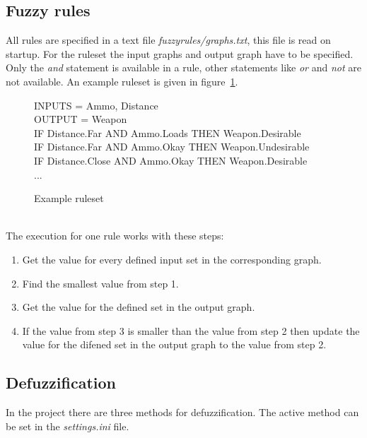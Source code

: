 \documentclass[10pt]{extarticle} %
\begin{document}
   \subsection{Fuzzy rules}
   All rules are specified in a text file \emph{fuzzyrules/graphs.txt}, this file is read on startup. For the ruleset the input graphs and output graph have to be specified. Only the \emph{and} statement is available in a rule, other statements like \emph{or} and \emph{not} are not available. An example ruleset is given in figure~\ref{fig:ruleset}.
   \begin{figure}[h!]
   {\ttfamily 
   		INPUTS = Ammo, Distance\\
  	 	OUTPUT = Weapon\\
   		IF Distance.Far AND Ammo.Loads THEN Weapon.Desirable \\
   		IF Distance.Far AND Ammo.Okay THEN Weapon.Undesirable \\
   		IF Distance.Close AND Ammo.Okay THEN Weapon.Desirable \\
   		...
   }
   \caption{Example ruleset}
   \label{fig:ruleset}
   \end{figure}\\
   The execution for one rule works with these steps:
   \begin{enumerate}
   \item Get the value for every defined input set in the corresponding graph.
   \item Find the smallest value from step 1.
   \item Get the value for the defined set in the output graph.
   \item If the value from step 3 is smaller than the value from step 2 then update the value for the difened set in the output graph to the value from step 2.
   \end{enumerate}
   \subsection{Defuzzification}
   In the project there are three methods for defuzzification. The active method can be set in the \emph{settings.ini} file.
   
\end{document}
